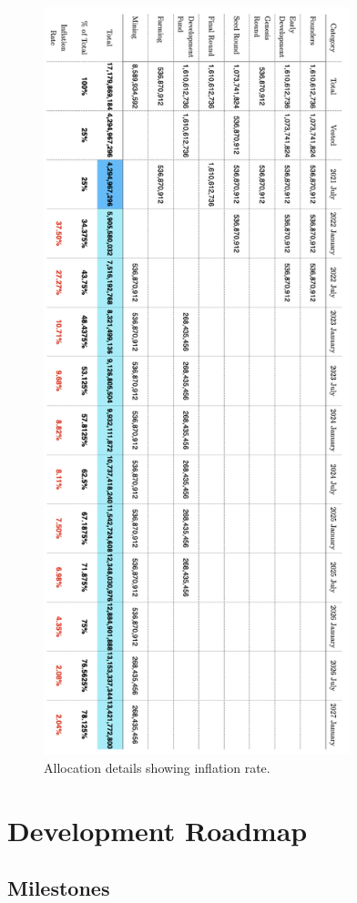 \documentclass[12pt]{article}
\begin{document}
\begin{figure}[H]
\centering
  \includegraphics[width=3.5in]{images/allocation_table_2.png}
  \caption{Allocation details showing inflation rate.}
  \label{fig:allocation_table2}
\end{figure}
 \thispagestyle{empty} 






\section{Development Roadmap}


\subsection{Milestones}
\end{document}
